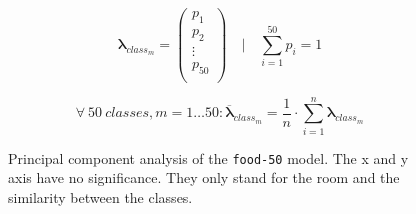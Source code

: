 \documentclass[10pt]{article}
\newcommand\inputpgf[2]{{
\let\pgfimageWithoutPath\pgfimage
\renewcommand{\pgfimage}[2][]{\pgfimageWithoutPath[##1]{#1/##2}}

}}
\newif\ifen
\newif\ifde
\newcommand{\en}[1]{\ifen#1\fi}
\newcommand{\de}[1]{\ifde#1\fi}
\begin{document}
					\begin{equation}
						\boldsymbol\lambda_{class_{m}} = 
						\left(
							\begin{array}{c}
							p_{1}\\
							p_{2}\\
							\vdots\\
							p_{50}\\
							\end{array}
						\right)
						\quad\Biggl\lvert \quad \sum_{i=1}^{50} p_i = 1
					\end{equation}
					
					\de{Von diesen Wahrscheinlichkeitsvektoren wird nun jeweils für jede Klasse ein Durchschnittsvektor aller \(n\) Elemente bestimmt, welche zur entsprechenden Klasse wirklich gehören. Man erhält also für dieses 50 Klassenmodell entsprechend 50 Klassenvektoren mit der Dimension 50.}
					\en{From these probability vectors, an average vector of all \(n\) elements is determined for each class, which really belong to the respective class. Thus, for this 50 class model, one obtains 50 class vectors with the dimension 50:}
					
					\begin{equation}
						\forall\ 50\ classes, m = 1 \dots 50:
						\overline{\boldsymbol\lambda}_{class_{m}} =
						\frac{1}{n} \cdot \sum_{i=1}^{n} \boldsymbol\lambda_{class_{m}}
					\end{equation}
					
					\de{Mittels Principal component analysis werden diese mehrdimensionalen Vektoren in einem zweidimensionalen Raum transformiert, um diese grafisch darstellen zu können.} 
					\en{Principal component analysis is used to transform these multidimensional vectors into a two-dimensional space in order to display them visually (Figure \ref{fig:analysis_pca_food_50}).}
				
					\begin{figure}[H]
						\begin{center}
							\scalebox{0.5}{
								\inputpgf{images/pgf}{pca.pgf}
							}
						\end{center}
						\caption[Principal component analysis of the \texttt{food-50} model]{Principal component analysis of the \texttt{food-50} model. The x and y axis have no significance. They only stand for the room and the similarity between the classes.}
						\label{fig:analysis_pca_food_50}
					\end{figure}
					
\end{document}

